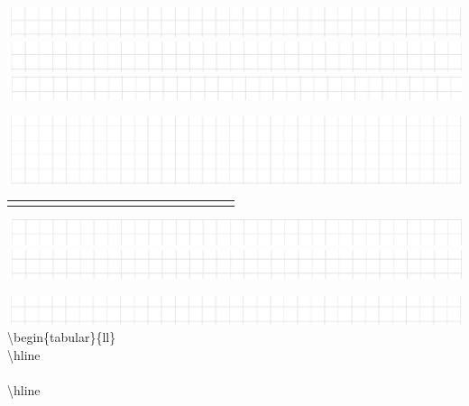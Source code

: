 \documentclass[10pt]{article}
\begin{document}
\includegraphics[max width=\textwidth, center]{2024_11_21_be8c615186155473dc68g-11(1)}\\
\includegraphics[max width=\textwidth, center]{2024_11_21_be8c615186155473dc68g-11(7)}\\
\includegraphics[max width=\textwidth, center]{2024_11_21_be8c615186155473dc68g-11(3)}

\includegraphics[max width=\textwidth]{2024_11_21_be8c615186155473dc68g-11(5)} \begin{tabular}{|l|l|l|l|l|l|l|l|l|l|l|l|l|l|l|l|l|l|}
\hline
 &  &  &  &  &  &  &  &  &  &  &  &  &  &  &  &  &  \\
\hline
 &  &  &  &  &  &  &  &  &  &  &  &  &  &  &  &  &  \\
\hline
\end{tabular}

\includegraphics[max width=\textwidth, center]{2024_11_21_be8c615186155473dc68g-11(4)}\\
\includegraphics[max width=\textwidth, center]{2024_11_21_be8c615186155473dc68g-11(2)}

\includegraphics[max width=\textwidth]{2024_11_21_be8c615186155473dc68g-11} \textbackslash begin\{tabular\}\{ll\}\\
\textbackslash hline \\
\\
\textbackslash hline

 \begin{tabular}{|l|l|l|l|l|l|l|l|l|l|l|l|l|l|l|l|l|l|}
\end{tabular}
\end{document}
